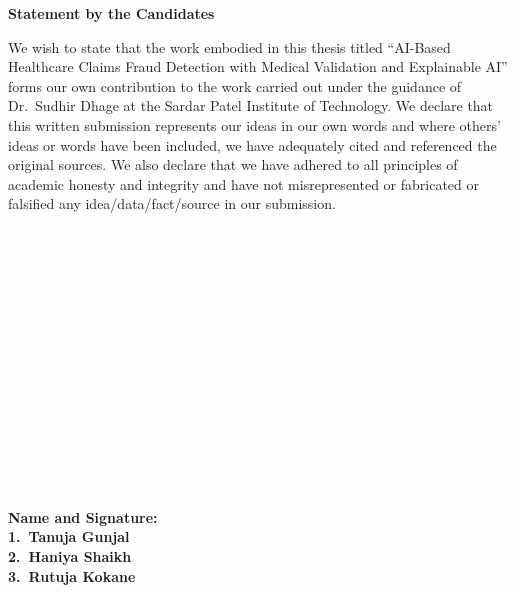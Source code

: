\newpage
\thispagestyle{empty}
\vspace*{0.2cm}
\vspace{1cm}
\begin{center}
 \large\textbf{Statement by the Candidates}
\end{center}
\vspace{2cm}
We wish to state that the work embodied in this thesis titled ``AI-Based Healthcare Claims Fraud Detection with Medical Validation and Explainable AI'' forms our own contribution to the work carried out under the guidance of Dr.\ Sudhir Dhage at the Sardar Patel Institute of Technology. We declare that this written submission represents our ideas in our own words and where others' ideas or words have been included, we have adequately cited and referenced the original sources. We also declare that we have adhered to all principles of academic honesty and integrity and have not misrepresented or fabricated or falsified any idea/data/fact/source in our submission.
\\
\\
\\
\\
\\
\\
\\
\\
\\
\\
\\
\\
\\
\\
\\
\\
\textbf {Name and Signature:}\\
\textbf {1.\ Tanuja Gunjal}\\
\textbf {2.\ Haniya Shaikh}\\
\textbf {3.\ Rutuja Kokane}\\
\newpage

